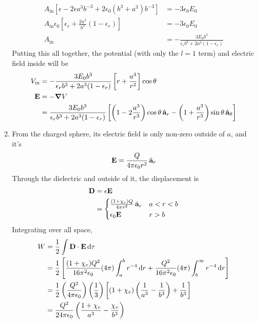 \documentclass{homework}
\begin{document}
\begin{enumerate}
\begin{align*}
			A_\mathrm{in} \left[\epsilon - 2\epsilon a^3 b^{-3} + 2 \epsilon_0 (b^3 + a^3) b^{-3} \right] & = -3\epsilon_0 E_0 \\
			A_\mathrm{in} \epsilon_0 \left[ \epsilon_r + \frac{2a^3}{b^3} (1 - \epsilon_r) \right] & = -3 \epsilon_0 E_0 \\
			A_\mathrm{in} & = -\frac{ 3 E_0 b^3 }{\epsilon_r b^3 + 2a^3 (1-\epsilon_r) }
		\end{align*}
		Putting this all together, the potential (with only the $l=1$ term) and electric field inside will be \begin{align*}
			V_\mathrm{in} & =  -\frac{ 3 E_0 b^3 }{\epsilon_r b^3 + 2a^3 (1-\epsilon_r) } \left[ r + \frac{ a^{3} }{r^2} \right] \cos \theta \\
			\boldsymbol{\mathrm{E}} & = -\grad{V} \\
				& = \frac{ 3 E_0 b^3 }{\epsilon_r b^3 + 2a^3 (1-\epsilon_r) } \left[
					\left(1 - 2\frac{ a^3 }{r^3} \right) \cos\theta \thinspace\hat{ \mathbf{a}}_{r} 
					- \left(1 + \frac{ a^3 }{r^3} \right) \sin \theta \thinspace\hat{ \mathbf{a}}_{\theta}
				\right]
		\end{align*}
		
		\item From the charged sphere, its electric field is only non-zero outside of $a$, and it's \[ \boldsymbol{\mathrm{E}} = \frac{Q}{4 \pi \epsilon_0 r^2} \thinspace\hat{ \mathbf{a}}_{r} \]
		Through the dielectric and outside of it, the displacement is \begin{align*}
			\bvec{D} & = \epsilon \bvec{E} \\
				& = \begin{cases*}
					\frac{ (1 + \chi_e) Q }{4 \pi  r^2} \uvec{r} & $a < r < b$\\
					\epsilon_0 \bvec{E} & $r > b$
				\end{cases*}
		\end{align*}
		Integrating over all space, \begin{align*}
			W & = \frac{1}{2} \int \boldsymbol{\mathrm{D}} \cdot \boldsymbol{\mathrm{E}} \dd{\tau} \\
				& = \frac{1}{2} \left[ \frac{(1 + \chi_e)Q^2}{16 \pi^2 \epsilon_0} (4 \pi) \int_a^b r^{-4} \dd{r} + \frac{Q^2}{16 \pi^2 \epsilon_0} (4 \pi) \int_b^\infty r^{-4} \dd{r} \right] \\
				& = \frac{1}{2} \left(\frac{Q^2}{4 \pi \epsilon_0}\right) \left(\frac{1}{3}\right) \left[
				(1 + \chi_e) \left(\frac{1}{a^3} - \frac{1}{b^3} \right)
				+ \frac{1}{b^3}
				\right] \\
				& = \frac{Q^2}{24 \pi \epsilon_0} \left(\frac{1 + \chi_e}{a^3} - \frac{\chi_e}{b^3}\right)
		\end{align*}
	\end{enumerate}
\end{document}

